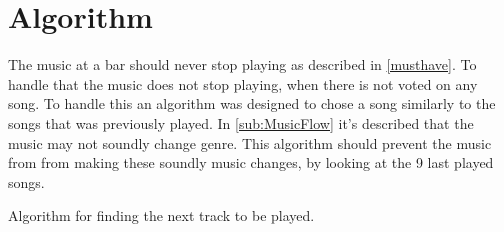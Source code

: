 \section{Algorithm}
\label{sec:algorithm}

The music at a bar should never stop playing as described in \cref{musthave}. To handle that the music does not stop playing, when there is not voted on any song. To handle this an algorithm was designed to chose a song similarly to the songs that was previously played. In \cref{sub:MusicFlow} it's described that the music may not soundly change genre. This algorithm should prevent the music from from making these soundly music changes, by looking at the 9 last played songs.

\begin{algorithm}[h]
\caption{Algorithm for finding the next track to be played.}
\begin{algorithmic}[1]
	 
		\EndIf{}
					\Else{}
					\EndIf{}
				\EndFor{}
			\EndFor{}
		\EndFor{}
			\EndIf{}
		\EndFor{}
			\State{}			
			\EndIf{}
		\EndFor{}
	\EndFunction{}
\end{algorithmic}
\end{algorithm}
